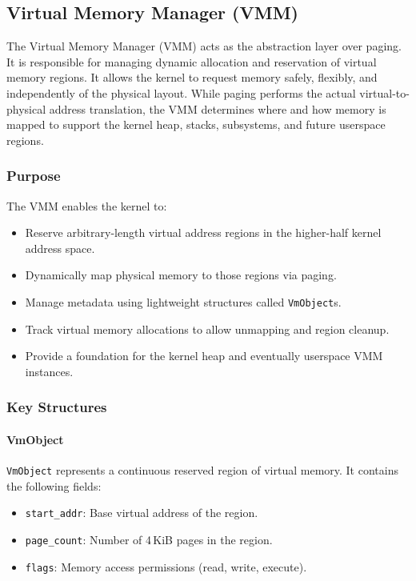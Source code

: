 \documentclass[12pt]{extarticle}
\begin{document}
\subsection{Virtual Memory Manager (VMM)}

The Virtual Memory Manager (VMM) acts as the abstraction layer over paging. It is responsible for managing dynamic allocation and reservation of virtual memory regions. It allows the kernel to request memory safely, flexibly, and independently of the physical layout. While paging performs the actual virtual-to-physical address translation, the VMM determines where and how memory is mapped to support the kernel heap, stacks, subsystems, and future userspace regions.

\subsubsection*{Purpose}

The VMM enables the kernel to:
\begin{itemize}
  \item Reserve arbitrary-length virtual address regions in the higher-half kernel address space.
  \item Dynamically map physical memory to those regions via paging.
  \item Manage metadata using lightweight structures called \texttt{VmObject}s.
  \item Track virtual memory allocations to allow unmapping and region cleanup.
  \item Provide a foundation for the kernel heap and eventually userspace VMM instances.
\end{itemize}

\subsubsection*{Key Structures}

\paragraph{VmObject} 

\texttt{VmObject} represents a continuous reserved region of virtual memory. It contains the following fields:
\begin{itemize}
  \item \texttt{start\_addr}: Base virtual address of the region.
  \item \texttt{page\_count}: Number of 4\,KiB pages in the region.
  \item \texttt{flags}: Memory access permissions (read, write, execute).
\end{itemize}
\end{document}
